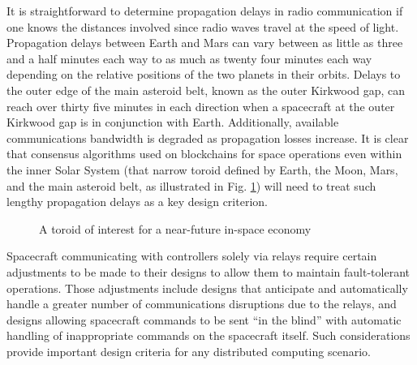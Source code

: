 \documentclass[journal ]{new-aiaa}
\begin{document}
It is straightforward to determine propagation delays in radio communication if one knows the distances involved since radio waves travel at the speed of light. Propagation delays between Earth and Mars can vary between as little as three and a half minutes each way 
to
 as much as twenty four minutes each way depending on the relative positions of the two planets in their orbits. Delays to the outer edge of the main asteroid belt, known as the outer Kirkwood gap, can reach over thirty five minutes in each direction when a spacecraft at the outer Kirkwood gap is in conjunction with Earth. Additionally, available communications bandwidth is degraded as propagation losses increase. It is clear that consensus algorithms used on blockchains for space operations even within the inner Solar System (that narrow toroid defined by Earth, the Moon, Mars, and the main asteroid belt, as illustrated in Fig. \ref{f:fig1-toroid-of-interest}) will need to treat such lengthy propagation delays as a key design criterion.

\begin{figure}[htb!]%
 \caption{A toroid of interest for a near-future in-space economy}
 \label{f:fig1-toroid-of-interest}
\end{figure}

Spacecraft communicating with controllers solely via relays require certain adjustments to be made to their designs to allow them to maintain fault-tolerant operations\cite{lewicki_phoenix_2006}. Those adjustments include designs that anticipate and automatically handle a greater number of communications disruptions due to the relays, and designs allowing spacecraft commands to be sent ``in the blind'' with automatic handling of inappropriate commands on the spacecraft itself. Such considerations provide important design criteria for any distributed computing scenario.
\end{document}
